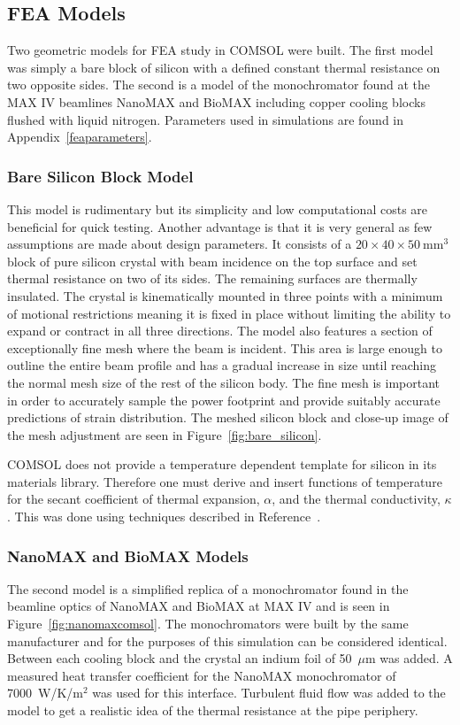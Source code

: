 \documentclass[preprint]{iucr}              %
\begin{document}
\subsection{FEA Models}

Two geometric models for FEA study in COMSOL were built. The first model was simply a bare block of silicon with a defined constant thermal resistance on two opposite sides. The second is a model of the monochromator found at the MAX IV beamlines NanoMAX and BioMAX including copper cooling blocks flushed with liquid nitrogen. Parameters used in simulations are found in Appendix~\ref{feaparameters}.

\subsubsection{Bare Silicon Block Model}
This model is rudimentary but its simplicity and low computational costs are beneficial for quick testing. Another advantage is that it is very general as few assumptions are made about design parameters. It consists of a $20\times 40\times 50~$mm$^3$ block of pure silicon crystal with beam incidence on the top surface and set thermal resistance on two of its sides. The remaining surfaces are thermally insulated. The crystal is kinematically mounted in three points with a minimum of motional restrictions meaning it is fixed in place without limiting the ability to expand or contract in all three directions. The model also features a section of exceptionally fine mesh where the beam is incident. This area is large enough to outline the entire beam profile and has a gradual increase in size until reaching the normal mesh size of the rest of the silicon body. The fine mesh is important in order to accurately sample the power footprint and provide suitably accurate predictions of strain distribution. The meshed silicon block and close-up image of the mesh adjustment are seen in Figure~\ref{fig:bare_silicon}.

COMSOL does not provide a temperature dependent template for silicon in its materials library. Therefore one must derive and insert functions of temperature for the secant coefficient of thermal expansion, $\alpha$, and the thermal conductivity, $\kappa$. This was done using techniques described in Reference~\cite{mash}.

\subsubsection{NanoMAX and BioMAX Models}\label{feamodels}
The second model is a simplified replica of a monochromator found in the beamline optics of NanoMAX and BioMAX at MAX IV and is seen in Figure~\ref{fig:nanomaxcomsol}. The monochromators were built by the same manufacturer and for the purposes of this simulation can be considered identical. Between each cooling block and the crystal an indium foil of 50~$\mu$m was added. A measured heat transfer coefficient for the NanoMAX monochromator of 7000~W/K/m$^{2}$ was used for this interface. Turbulent fluid flow was added to the model to get a realistic idea of the thermal resistance at the pipe periphery.
\end{document}
